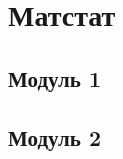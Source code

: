 \documentclass[../konspect.tex]{subfiles}
\begin{document}
  \part{Матстат}

  \chapter{Модуль 1}

  
  
  
  
  
  
  

  \chapter{Модуль 2}

  
  
  
  
  
  
  
\end{document}
